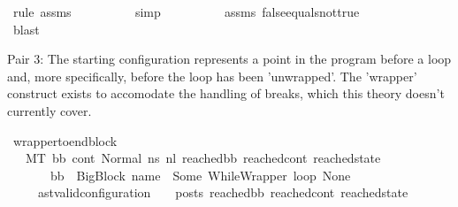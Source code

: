 \begin{isabellebody}
\ {\isacharparenleft}{\kern0pt}rule\ assms{\isacharparenleft}{\kern0pt}{}{\isacharparenright}{\kern0pt}{\isacharparenright}{\kern0pt}\isanewline
\ \ \ \ \ \ \ \ \isamarkupfalse%
\ simp{\isacharplus}{\kern0pt}\isanewline
\ \ \ \ \ \ \ \ \isamarkupfalse%
\ assms{\isacharparenleft}{\kern0pt}{}{\isacharparenright}{\kern0pt}\ false{\isacharunderscore}{\kern0pt}equals{\isacharunderscore}{\kern0pt}not{\isacharunderscore}{\kern0pt}true\ \isanewline
\ \ \ \ \ \ \ \ \isamarkupfalse%
\ blast\isanewline
\ \ \ \ \isamarkupfalse%
\isanewline
\ \ \isamarkupfalse%
\isanewline
{}\isamarkupfalse%
%
\endisatagproof
{\isafoldproof}%
%
\isadelimproof
%
\endisadelimproof
%
\begin{isamarkuptext}%
Pair 3: The starting configuration represents a point in the program before a loop and, more 
              specifically, before the loop has been 'unwrapped'.
              The 'wrapper' construct exists to accomodate the handling of breaks, which this theory 
              doesn't currently cover.%
\end{isamarkuptext}\isamarkuptrue%
\isamarkupfalse%
\ wrapper{\isacharunderscore}{\kern0pt}to{\isacharunderscore}{\kern0pt}endblock{\isacharcolon}{\kern0pt}\isanewline
\ \ \ {\isachardoublequoteopen}M{\isacharcomma}{\kern0pt}{\isasymLambda}{\isacharcomma}{\kern0pt}{\isasymGamma}{\isacharcomma}{\kern0pt}{\isasymOmega}{\isacharcomma}{\kern0pt}T\ {\isasymturnstile}{\isacharparenleft}{\kern0pt}bb{}{\isacharcomma}{\kern0pt}\ cont{}{\isacharcomma}{\kern0pt}\ Normal\ ns{\isacharparenright}{\kern0pt}\ {\isacharminus}{\kern0pt}n{\isasymlongrightarrow}{\isacharcircum}{\kern0pt}l\ {\isacharparenleft}{\kern0pt}reached{\isacharunderscore}{\kern0pt}bb{\isacharcomma}{\kern0pt}\ reached{\isacharunderscore}{\kern0pt}cont{\isacharcomma}{\kern0pt}\ reached{\isacharunderscore}{\kern0pt}state{\isacharparenright}{\kern0pt}{\isachardoublequoteclose}\isanewline
\ \ \ \ \ \ \ {\isachardoublequoteopen}bb{}\ {\isacharequal}{\kern0pt}\ BigBlock\ name\ {\isacharbrackleft}{\kern0pt}{\isacharbrackright}{\kern0pt}\ {\isacharparenleft}{\kern0pt}Some\ {\isacharparenleft}{\kern0pt}WhileWrapper\ loop{\isacharparenright}{\kern0pt}{\isacharparenright}{\kern0pt}\ None{\isachardoublequoteclose}\isanewline
\ \ \ \ \ {\isachardoublequoteopen}{\isacharparenleft}{\kern0pt}ast{\isacharunderscore}{\kern0pt}valid{\isacharunderscore}{\kern0pt}configuration\ {\isasymLambda}\ {\isasymGamma}\ {\isasymOmega}\ posts\ reached{\isacharunderscore}{\kern0pt}bb\ reached{\isacharunderscore}{\kern0pt}cont\ reached{\isacharunderscore}{\kern0pt}state{\isacharparenright}{\kern0pt}\ {\isasymor}\ \isanewline

\end{isabellebody}
